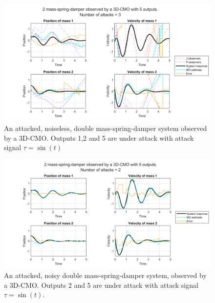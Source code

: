\begin{figure}[H]
    \centering
    \includegraphics[width=\linewidth]{report/Figures/symplot_5o3a.png}
    \caption{An attacked, noiseless, double mass-spring-damper system observed by a 3D-CMO. Outputs 1,2 and 5 are under attack with attack signal $\tau=\sin(t)$}
    \label{fig:too-much-attacks-linear}
\end{figure}

\begin{figure}[H]
    \centering
    \includegraphics[width=\linewidth]{report/Figures/symplot_5o2a_noise.png}
    \caption{An attacked, noisy double mass-spring-damper system, observed by a 3D-CMO. Outputs 2 and 5 are under attack with attack signal $\tau=\sin(t)$.}
    \label{fig:noisy-attacked-system}
\end{figure}
